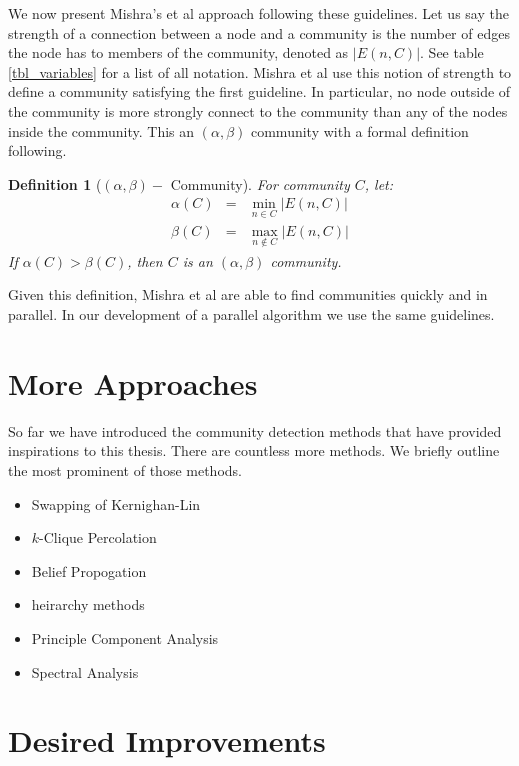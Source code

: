 \documentclass[phd,tocprelim]{cornell}
\newtheorem{definition}{Definition}
\begin{document}
We now present Mishra's et al \cite{mishra} approach following these guidelines.  Let us say the strength of a connection between a node and a community is the number of edges the node has to members of the community, denoted as $|E(n, C)|$.  See table \ref{tbl_variables} for a list of all notation. Mishra et al \cite{mishra} use this notion of strength to define a community satisfying the first guideline.  In particular, no node outside of the community is more strongly connect to the community than any of the nodes inside the community.  This an $(\alpha, \beta)$ community with a formal definition following.
\begin{definition}[$(\alpha, \beta) - $ Community]
For community $C$, let:
\begin{eqnarray*}
\alpha(C) &=& \min\limits_{n \in C} |E(n, C)|\\
\beta(C) &=& \max\limits_{n \notin C} |E(n, C)|
\end{eqnarray*}
If $\alpha(C) > \beta(C)$, then $C$ is an $(\alpha, \beta)$ community.
\end{definition}

Given this definition, Mishra et al\cite{mishra} are able to find communities quickly and in parallel.  In our development of a parallel algorithm we use the same guidelines.

\section {More Approaches}

So far we have introduced the community detection methods that have provided inspirations to this thesis.  There are countless more methods.  We briefly outline the most prominent of those methods.

\begin{itemize}
\item Swapping of Kernighan-Lin
\item $k$-Clique Percolation
\item Belief Propogation
\item heirarchy methods
\item Principle Component Analysis
\item Spectral Analysis
\end{itemize}


\section {Desired Improvements}
\end{document}
